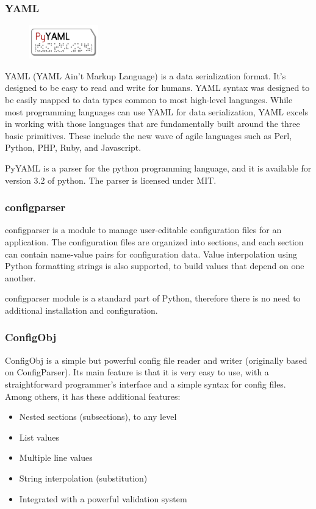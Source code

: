 \subsubsection{YAML}
\begin{figure}
	\begin{center}
	\vspace{-30pt}
		\includegraphics[width=3cm]{./planning/img/pyyaml_logo}
	\vspace{-30pt}
	\end{center}
\end{figure}
YAML (YAML Ain't Markup Language) is a data serialization format. It's designed
to be easy to read and write for humans. YAML syntax was designed to be easily
mapped to data types common to most high-level languages. While most
programming languages can use YAML for data serialization, YAML excels in
working with those languages that are fundamentally built around the three
basic primitives. These include the new wave of agile languages such as Perl,
Python, PHP, Ruby, and Javascript.

PyYAML is a parser for the python programming language, and it is available for
version 3.2 of python. The parser is licensed under MIT.

\subsubsection{configparser}
configparser is a module to manage user-editable configuration files for an
application. The configuration files are organized into sections, and each
section can contain name-value pairs for configuration data. Value
interpolation using Python formatting strings is also supported, to build
values that depend on one another.

configparser module is a standard part of Python, therefore there is no need
to additional installation and configuration.

\subsubsection{ConfigObj}
ConfigObj is a simple but powerful config file reader and writer (originally
based on ConfigParser). Its main feature is that it is very easy to use, with
a straightforward programmer's interface and a simple syntax for config files.
Among others, it has these additional features:
\begin{itemize}
	\item Nested sections (subsections), to any level
	\item List values
	\item Multiple line values
	\item String interpolation (substitution)
	\item Integrated with a powerful validation system
\end{itemize}

